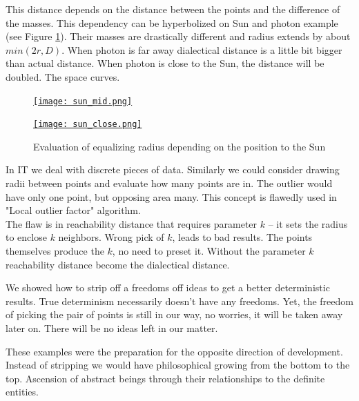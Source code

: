 \documentclass[12pt, a4paper, twocolumn]{article}
\newcommand{\githubPics}{https://raw.githubusercontent.com/artamono/druhg/master/papers/druhg/}
\begin{document}
This distance depends on the distance between the points and the difference of the masses. This dependency can be hyperbolized on Sun and photon example (see Figure \ref{fig:photonSun}). Their masses are drastically different and radius extends by about $min(2r, D)$. When photon is far away dialectical distance is a little bit bigger than actual distance. When photon is close to the Sun, the distance will be doubled. The space curves.

\begin{figure}
  \centering
  \begin{minipage}[t]{.45\linewidth}
    \href{\githubPics sun_mid.png}{\texttt{[image: sun\_mid.png]}}
    \label{fig:photonFar}
  \end{minipage}
  \hspace{.02\linewidth}
  \begin{minipage}[t]{.45\linewidth}
    \href{\githubPics sun_close.png}{\texttt{[image: sun\_close.png]}}
    \label{fig:photonClose}
  \end{minipage}
\caption{Evaluation of equalizing radius depending on the position to the Sun}
\label{fig:photonSun}
\end{figure}

In IT we deal with discrete pieces of data. Similarly we could consider drawing radii between points and evaluate how many points are in. The outlier would have only one point, but opposing area many.
This concept is flawedly used in "Local outlier factor"\cite{LocalOutlierFactor} algorithm.
\\ The flaw is in reachability distance that requires parameter $k$ -- it sets the radius to enclose $k$ neighbors. Wrong pick of $k$, leads to bad results. The points themselves produce the $k$, no need to preset it. Without the parameter $k$ reachability distance become the dialectical distance. 

We showed how to strip off a freedoms off ideas to get a better deterministic results.
True determinism necessarily doesn't have any freedoms.
Yet, the freedom of picking the pair of points is still in our way, no worries, it will be taken away later on. There will be no ideas left in our matter.

These examples were the preparation for the opposite direction of development. Instead of stripping we would have philosophical growing from the bottom to the top. Ascension of abstract beings through their relationships to the definite entities.
\end{document}
